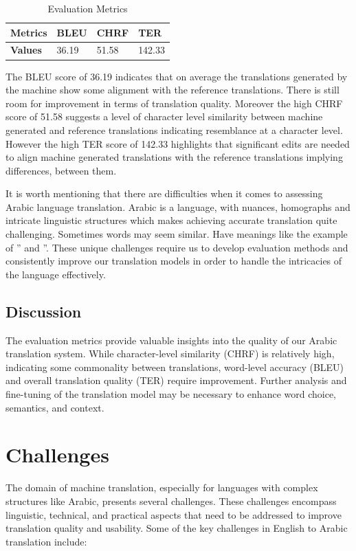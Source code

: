 \documentclass[12pt]{article}
\begin{document}
\begin{table}[h]
	\centering
	\begin{tabular}{|p{4cm}|p{2cm}|p{2cm}|p{2cm}|}
		\hline
		\textbf{Metrics} & \textbf{BLEU}  & \textbf{CHRF} & \textbf{TER}\\
		\hline
		\textbf{Values} & 36.19 & 51.58  & 142.33 \\
		\hline
	\end{tabular}
	\caption{Evaluation Metrics}
	\label{tab:evaluation-metrics}
\end{table}

The BLEU score of 36.19 indicates that on average the translations generated by the machine show some alignment with the reference translations. There is still room for improvement in terms of translation quality. Moreover the high CHRF score of 51.58 suggests a level of character level similarity between machine generated and reference translations indicating resemblance at a character level. However the high TER score of 142.33 highlights that significant edits are needed to align machine generated translations with the reference translations implying differences, between them.

It is worth mentioning that there are difficulties when it comes to assessing Arabic language translation. Arabic is a language, with nuances, homographs and intricate linguistic structures which makes achieving accurate translation quite challenging. Sometimes words may seem similar. Have meanings like the example of '' and ''. These unique challenges require us to develop evaluation methods and consistently improve our translation models in order to handle the intricacies of the language effectively.

\subsection{Discussion}

The evaluation metrics provide valuable insights into the quality of our Arabic translation system. While character-level similarity (CHRF) is relatively high, indicating some commonality between translations, word-level accuracy (BLEU) and overall translation quality (TER) require improvement. Further analysis and fine-tuning of the translation model may be necessary to enhance word choice, semantics, and context.


\section{Challenges}
The domain of machine translation, especially for languages with complex structures like Arabic, presents several challenges. These challenges encompass linguistic, technical, and practical aspects that need to be addressed to improve translation quality and usability. Some of the key challenges in English to Arabic translation include:
\end{document}
